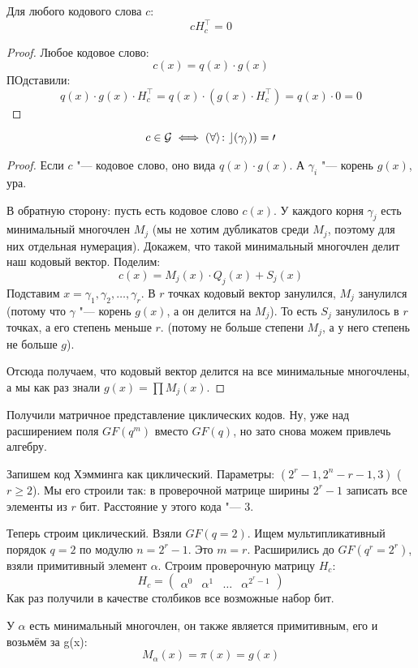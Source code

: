 \begin{lemma}
	Для любого кодового слова $c$:
	\[
	c H_c^\top = 0
	\]
\end{lemma}
\begin{proof}
	Любое кодовое слово:
	\[
	c(x) = q(x) \cdot g(x)
	\]
	ПОдставили:
	\[
	q(x) \cdot g(x) \cdot H_c^\top = q(x) \cdot (g(x) \cdot H_c^\top) = q(x) \cdot 0 = 0
	\]
\end{proof}
\begin{lemma}
	\[ c \in \cal G \iff (\forall i \colon c(\gamma_i)) = 0 \]
\end{lemma}
\begin{proof}
	Если $c$ "--- кодовое слово, оно вида $q(x) \cdot g(x)$.
	А $\gamma_i$ "--- корень $g(x)$, ура.

	В обратную сторону:
	пусть есть кодовое слово $c(x)$.
	У каждого корня $\gamma_j$ есть минимальный многочлен $M_j$ (мы не хотим дубликатов среди $M_j$,
	поэтому для них отдельная нумерация).
	Докажем, что такой минимальный многочлен делит наш кодовый вектор.
	Поделим:
	\[
	c(x) = M_j(x) \cdot Q_j(x) + S_j(x)
	\]
	Подставим $x=\gamma_1, \gamma_2, \dots, \gamma_r$.
	В $r$ точках кодовый вектор занулился,
	$M_j$ занулился (потому что $\gamma$ "--- корень $g(x)$, а он делится на $M_j$).
	То есть $S_j$ занулилось в $r$ точках, а его степень меньше $r$.
	(потому не больше степени $M_j$, а у него степень не больше $g$).

	Отсюда получаем, что кодовый вектор делится на все минимальные многочлены,
	а мы как раз знали $g(x)=\prod M_j(x)$.
\end{proof}

\begin{Rem}
	Получили матричное представление циклических кодов.
	Ну, уже над расширением поля $GF(q^m)$ вместо $GF(q)$,
	но зато снова можем привлечь алгебру.
\end{Rem}

\begin{Rem}
	Запишем код Хэмминга как циклический.
	Параметры: $(2^r-1,2^n-r-1,3)$ ($r \ge 2$).
	Мы его строили так: в проверочной матрице
	ширины $2^r-1$ записать все элементы из $r$ бит.
	Расстояние у этого кода "--- 3.

	Теперь строим циклический.
	Взяли $GF(q=2)$.
	Ищем мультипликативный порядок $q=2$ по модулю $n=2^r-1$.
	Это $m=r$.
	Расширились до $GF(q^r=2^r)$, взяли примитивный элемент $\alpha$.
	Строим проверочную матрицу $H_c$:
	\[
	H_c = \begin{pmatrix}
	\alpha^0 & \alpha^1 & \dots & \alpha^{2^r-1}
	\end{pmatrix}
	\]
	Как раз получили в качестве столбиков все возможные набор бит.

	У $\alpha$ есть минимальный многочлен, он также является примитивным,
	его и возьмём за g(x):
	\[
		M_\alpha(x) = \pi(x) = g(x)
	\]
\end{Rem}

